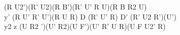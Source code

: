 (R U2')(R' U2)(R B')(R' U' R U)(R B R2 U)\\
y' (R U' R' U')(R U R) D (R' U' R) D' (R' U2 R')(U')\\
y2 z (U R2 ')(U' R2)(U F')(U' R' U R)(U F U2' R)\\
